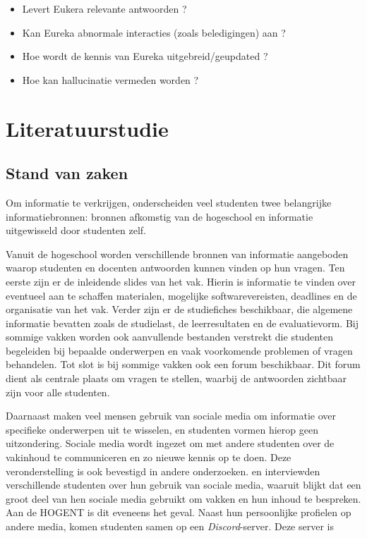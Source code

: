 \begin{itemize}
  \item Levert Eukera relevante antwoorden ? 
  \item Kan Eureka abnormale interacties (zoals beledigingen) aan ?
  \item Hoe wordt de kennis van Eureka uitgebreid/geupdated ?
  \item Hoe kan hallucinatie vermeden worden ? 
\end{itemize}


\section{Literatuurstudie}%
\label{sec:literatuurstudie}

\subsection{Stand van zaken}

Om informatie te verkrijgen, onderscheiden veel studenten twee belangrijke informatiebronnen: bronnen afkomstig van de hogeschool en informatie uitgewisseld door studenten zelf.

Vanuit de hogeschool worden verschillende bronnen van informatie aangeboden waarop studenten en docenten antwoorden kunnen vinden op hun vragen. Ten eerste zijn er de inleidende slides van het vak. Hierin is informatie te vinden over eventueel aan te schaffen materialen, mogelijke softwarevereisten, deadlines en de organisatie van het vak. Verder zijn er de studiefiches beschikbaar, die algemene informatie bevatten zoals de studielast, de leerresultaten en de evaluatievorm. Bij sommige vakken worden ook aanvullende bestanden verstrekt die studenten begeleiden bij bepaalde onderwerpen en vaak voorkomende problemen of vragen behandelen. Tot slot is bij sommige vakken ook een forum beschikbaar. Dit forum dient als centrale plaats om vragen te stellen, waarbij de antwoorden zichtbaar zijn voor alle studenten.

Daarnaast maken veel mensen gebruik van sociale media om informatie over specifieke onderwerpen uit te wisselen, en studenten vormen hierop geen uitzondering. Sociale media wordt ingezet om met andere studenten over de vakinhoud te communiceren en zo nieuwe kennis op te doen. Deze veronderstelling is ook bevestigd in andere onderzoeken. \textcite{M.Talaue2018} en \textcite{Bal2017} interviewden verschillende studenten over hun gebruik van sociale media, waaruit blijkt dat een groot deel van hen sociale media gebruikt om vakken en hun inhoud te bespreken. Aan de HOGENT is dit eveneens het geval. Naast hun persoonlijke profielen op andere media, komen studenten samen op een \textit{Discord}-server. Deze server is 


